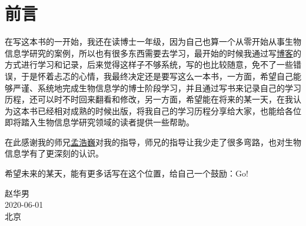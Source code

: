\chapter*{前言}
在写这本书的一开始，我还在读博士一年级，因为自己也算一个从零开始从事生物信息学研究的案例，所以也有很多东西需要去学习，最开始的时候我通过写\href{http://zhaohuanan.cc}{博客}的方式进行学习和记录，后来觉得这样子不够系统，写的也比较随意，免不了一些错误，于是怀着忐忑的心情，我最终决定还是要写这么一本书，一方面，希望自己能够严谨、系统地完成生物信息学的博士阶段学习，并且通过写书来记录自己的学习历程，还可以时不时回来翻看和修改，另一方面，希望能在将来的某一天，在我认为这本书已经相对成熟的时候出版，将我自己的学习历程分享给大家，也能给各位即将踏入生物信息学研究领域的读者提供一些帮助。

\begin{center}
  在此感谢我的师兄\href{https://www.zhihu.com/people/meng_howard}{孟浩巍}对我的指导，师兄的指导让我少走了很多弯路，也对生物信息学有了更深刻的认识。
\end{center}

希望未来的某天，能有更多话写在这个位置，给自己一个鼓励：Go!


\vskip 1.5cm

\begin{flushright}
赵华男\\
2020-06-01\\
北京
\end{flushright}